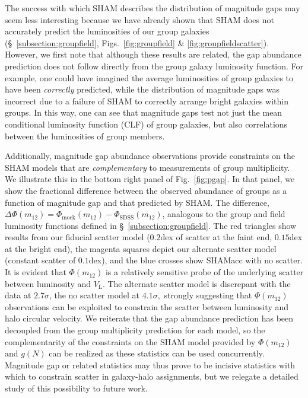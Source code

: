 \documentclass[usenatbib,usegraphicx,letterpaper]{mn2e}
\newcommand{\monetwo}{m_{12}}
\newcommand{\vl}{V_{\mathrm{L}}}
\begin{document}
The success with which SHAM describes the distribution of magnitude gaps 
may seem less interesting because we have already shown that SHAM does not 
accurately predict the luminosities of our group galaxies 
(\S~\ref{subsection:groupfield}, Figs.~\ref{fig:groupfield} \& \ref{fig:groupfieldscatter}). 
However, we first note that although these results are related, the gap abundance prediction 
does not follow directly from the group galaxy luminosity function. For example, 
one could have imagined the average luminosities of group galaxies to have 
been {\em correctly} predicted, while the distribution of magnitude gaps was 
incorrect due to a failure of SHAM to correctly arrange bright galaxies within groups. 
In this way, one can see that magnitude gaps test not just the mean conditional 
luminosity function (CLF) of group galaxies, but also correlations between the luminosities 
of group members.

Additionally, magnitude gap abundance observations provide constraints on 
the SHAM models that are {\em complementary} to measurements of group multiplicity. 
We illustrate this in the bottom right panel of Fig.~\ref{fig:pgap}.  
In that panel, we show the fractional difference between the observed 
abundance of groups as a function of magnitude gap and that predicted by 
SHAM.  The difference, $\Delta\Phi(\monetwo) = \Phi_{\mathrm{mock}}(\monetwo)-\Phi_{\mathrm{SDSS}}(\monetwo)$, 
analogous to the group and field luminosity functions defined  in \S~\ref{subsection:groupfield}.  
The red triangles show results from our fiducial scatter model 
($0.2$dex of scatter at the faint end, $0.15$dex at the bright end), 
the magenta squares depict our alternate scatter model (constant scatter of $0.1$dex), 
and the blue crosses show SHAMacc with no scatter. 
It is evident that $\Phi(\monetwo)$ is a relatively 
sensitive probe of the underlying scatter between luminosity and $\vl$.
The alternate scatter model is discrepant with the data at $2.7\sigma$, 
the no scatter model at $4.1\sigma,$ strongly suggesting that $\Phi(\monetwo)$ observations 
can be exploited to constrain the scatter between luminosity and halo circular velocity. 
We reiterate that the gap abundance prediction has been decoupled from the group multiplicity 
prediction for each model, so the complementarity of the constraints on the SHAM model 
provided by $\Phi(\monetwo)$ and $g(N)$ can be realized as these statistics can be used 
concurrently. Magnitude gap or related statistics may thus prove to be incisive statistics 
with which to constrain scatter in galaxy-halo assignments, but we relegate 
a detailed study of this possibility to future work.
\end{document}
